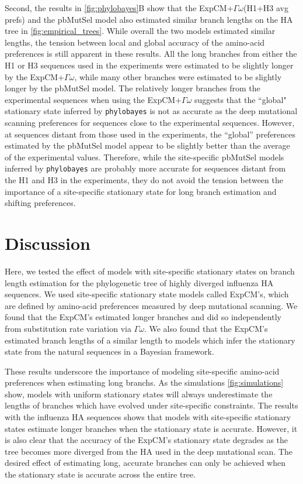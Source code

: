 \documentclass[11pt]{article}
\begin{document}
Second, the results in \ref{fig:phylobayes}B show that the ExpCM+$\Gamma\omega$(H1+H3 avg prefs) and the pbMutSel model also estimated similar branch lengths on the HA tree in \ref{fig:empirical_trees}. 
While overall the two models estimated similar lengths, the tension between local and global accuracy of the amino-acid preferences is still apparent in these results. 
All the long branches from either the H1 or H3 sequences used in the experiments were estimated to be slightly longer by the ExpCM+$\Gamma\omega$, while many other branches were estimated to be slightly longer by the pbMutSel model. 
The relatively longer branches from the experimental sequences when using the ExpCM+$\Gamma\omega$ suggests that the ``global" stationary state inferred by \texttt{phylobayes} is not as accurate as the deep mutational scanning preferences for sequences close to the experimental sequences. 
However, at sequences distant from those used in the experiments, the ``global'' preferences estimated by the pbMutSel model appear to be slightly better than the average of the experimental values.
Therefore, while the site-specific pbMutSel models inferred by \texttt{phylobayes} are probably more accurate for sequences distant from the H1 and H3 in the experiments, they do not avoid the tension between the importance of a site-specific stationary state for long branch estimation and shifting preferences. 

\section*{Discussion}

Here, we tested the effect of models with site-specific stationary states on branch length estimation for the phylogenetic tree of highly diverged influenza HA sequences. 
We used site-specific stationary state models called ExpCM's, which are defined by amino-acid preferences measured by deep mutational scanning. 
We found that the ExpCM's estimated longer branches and did so independently from substitution rate variation via $\Gamma\omega$. 
We also found that the ExpCM's estimated branch lengths of a similar length to models which infer the stationary state from the natural sequences in a Bayesian framework.  

These results underscore the importance of modeling site-specific amino-acid preferences when estimating long branchs. 
As the simulations \ref{fig:simulations} show, models with uniform stationary states will always underestimate the lengths of branches which have evolved under site-specific constraints. 
The results with the influenza HA sequences shows that models with site-specific stationary states estimate longer branches when the stationary state is accurate. 
However, it is also clear that the accuracy of the ExpCM's stationary state degrades as the tree becomes more diverged from the HA used in the deep mutational scan. 
The desired effect of estimating long, accurate branches can only be achieved when the stationary state is accurate across the entire tree. 
\end{document}
